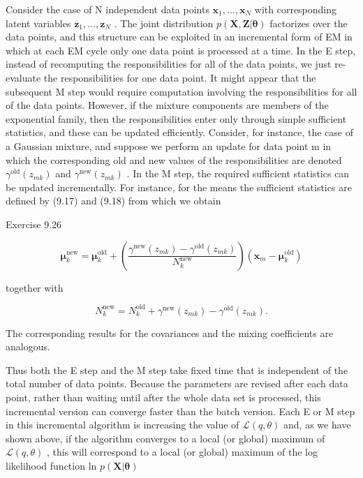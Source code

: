 \documentclass[
  10
]{article}
\begin{document}
Consider the case of N independent data points
\(\mathbf { x } _ { 1 } , \ldots , \mathbf { x } _ { N }\) with
corresponding latent variables
\(\mathbf { z } _ { 1 } , \ldots , \mathbf { z } _ { N }\) . The joint
distribution
\(p ( \mathbf { X } , \mathbf { Z } | \boldsymbol { \theta } )\)
factorizes over the data points, and this structure can be exploited in
an incremental form of EM in which at each EM cycle only one data point
is processed at a time. In the E step, instead of recomputing the
responsibilities for all of the data points, we just re-evaluate the
responsibilities for one data point. It might appear that the subsequent
M step would require computation involving the responsibilities for all
of the data points. However, if the mixture components are members of
the exponential family, then the responsibilities enter only through
simple sufficient statistics, and these can be updated efficiently.
Consider, for instance, the case of a Gaussian mixture, and suppose we
perform an update for data point m in which the corresponding old and
new values of the responsibilities are denoted
\(\gamma ^ { \mathrm { o l d } } ( z _ { m k } )\) and
\(\gamma ^ { \mathrm { n e w } } ( z _ { m k } )\) . In the M step, the
required sufficient statistics can be updated incrementally. For
instance, for the means the sufficient statistics are defined by (9.17)
and (9.18) from which we obtain

Exercise 9.26

\[
\pmb {\mu} _ {k} ^ {\mathrm{new}} = \pmb {\mu} _ {k} ^ {\mathrm{old}} + \left(\frac {\gamma^ {\mathrm{new}} (z _ {m k}) - \gamma^ {\mathrm{old}} (z _ {m k})}{N _ {k} ^ {\mathrm{new}}}\right) (\mathbf {x} _ {m} - \pmb {\mu} _ {k} ^ {\mathrm{old}})\tag{9.78}
\]

together with

\[
N _ {k} ^ {\mathrm{new}} = N _ {k} ^ {\mathrm{old}} + \gamma^ {\mathrm{new}} (z _ {m k}) - \gamma^ {\mathrm{old}} (z _ {m k}).\tag{9.79}
\]

The corresponding results for the covariances and the mixing
coefficients are analogous.

Thus both the E step and the M step take fixed time that is independent
of the total number of data points. Because the parameters are revised
after each data point, rather than waiting until after the whole data
set is processed, this incremental version can converge faster than the
batch version. Each E or M step in this incremental algorithm is
increasing the value of \(\mathcal { L } ( q , \theta )\) and, as we
have shown above, if the algorithm converges to a local (or global)
maximum of \(\mathcal { L } ( q , \theta )\) , this will correspond to a
local (or global) maximum of the log likelihood function ln
\(p ( \mathbf { X } | \pmb { \theta } )\)
\end{document}
